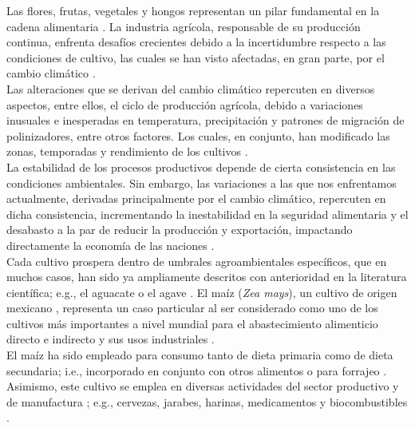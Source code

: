 Las flores, frutas, vegetales y hongos representan un pilar fundamental en la cadena alimentaria \citep{Cassani_2022}. La industria agrícola, responsable de su producción continua, enfrenta desafíos crecientes debido a la incertidumbre respecto a las condiciones de cultivo, las cuales se han visto afectadas, en gran parte, por el cambio climático \citep{Parajuli_2019}.\\

Las alteraciones que se derivan del cambio climático repercuten en diversos aspectos, entre ellos, el ciclo de producción agrícola, debido a variaciones inusuales e inesperadas en temperatura, precipitación y patrones de migración de polinizadores, entre otros factores. Los cuales, en conjunto, han modificado las zonas, temporadas y rendimiento de los cultivos \citep{Bayable_2021, Cuevas_2021, Parajuli_2019}.\\

La estabilidad de los procesos productivos depende de cierta consistencia en las condiciones ambientales. Sin embargo, las variaciones a las que nos enfrentamos actualmente, derivadas principalmente por el cambio climático, repercuten en dicha consistencia, incrementando la inestabilidad en la seguridad alimentaria y el desabasto a la par de reducir la producción y exportación, impactando directamente la economía de las naciones \citep{Farooq_2022}.\\

Cada cultivo prospera dentro de umbrales agroambientales específicos, que en muchos casos, han sido ya ampliamente descritos con anterioridad en la literatura científica; e.g., el aguacate \citep{Moraes_2022, Rocha-Arroyo_2011} o el agave \citep{García-Mendoza_2002}. El maíz (\textit{Zea mays}), un cultivo de origen mexicano \citep{OrozcoRamrez_2016}, representa un caso particular al ser considerado como uno de los cultivos más importantes a nivel mundial para el abastecimiento alimenticio directo e indirecto y sus usos industriales \citep{Revilla_2022}.\\

El maíz ha sido empleado para consumo tanto de dieta primaria como de dieta secundaria; i.e., incorporado en conjunto con otros alimentos o para forrajeo \citep{Revilla_2022}. Asimismo, este cultivo se emplea en diversas actividades del sector productivo y de manufactura \citep{Ranum_2014}; e.g., cervezas, jarabes, harinas, medicamentos y biocombustibles \citep{Rausch_2006,SOKANADEAGA_2024, Zhang_2022}.\\


